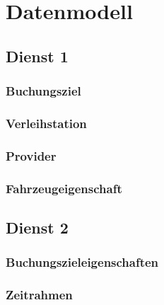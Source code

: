 \chapter{Datenmodell}
\label{sec:Datenmodell}

\section{Dienst 1}
\label{subsec:Datenmodell:Dienst1}

\subsection*{Buchungsziel}



\subsection*{Verleihstation}



\subsection*{Provider}



\subsection*{Fahrzeugeigenschaft}




\section{Dienst 2}
\label{subsec:Datenmodell:Dienst1}

\subsection*{Buchungszieleigenschaften}



\subsection*{Zeitrahmen}



